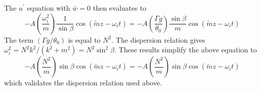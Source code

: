 \documentclass[12pt]{article}
\begin{document}
The $u^\prime$ equation with $\bar{w}=0$ then evaluates to
%
\begin{equation}
-A\left(\frac{\omega_i^2}{m}\right)\frac{1}{\sin\beta}
\cos(\tilde{m}z-\omega_i t) =  -A\left(\frac{\Gamma g}{\theta_0}\right)
\frac{\sin\beta}{m}\cos(\tilde{m}z-\omega_i t)
\end{equation}
%
The term $(\Gamma g/\theta_0)$ is equal to $N^2$.  The dispersion relation
gives $\omega_i^2 = N^2 k^2/(k^2 + m^2) = N^2\sin^2\beta$.  These results
simplify the above equation to
%
\begin{equation}
-A\left(\frac{N^2}{m}\right)\sin\beta
\cos(\tilde{m}z-\omega_i t) =  -A\left(\frac{N^2}{m}\right)
\sin\beta\cos(\tilde{m}z-\omega_i t)
\end{equation}
%
which validates the dispersion relation used above.
\end{document}
